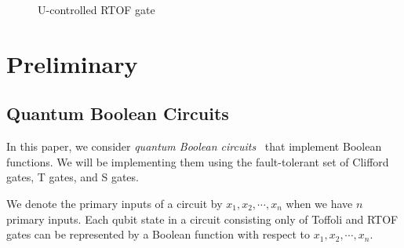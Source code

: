 

\begin{figure}[ht]
  \begin{minipage}{.46\textwidth}

    \begin{center}
      
      \caption{A Boolean logic network}
      \label{fig-lut-network}
    \end{center}
  \end{minipage}
  \begin{minipage}{.46\linewidth}
    \begin{center}
      
    \end{center}
    \caption{U-controlled RTOF gate}
    \label{fig-urtof}
  \end{minipage}
\end{figure}
\section{Preliminary}
\label{Sec:prelim}
\subsection{Quantum Boolean Circuits}

In this paper, we consider {\it quantum Boolean circuits}~\cite{bib-ddmf} that implement Boolean functions. We will be implementing them using the fault-tolerant set of Clifford gates, T gates, and S gates. 

We denote the primary inputs of a circuit by $x_1, x_2, \cdots,x_{n}$  when we have $n$ primary inputs. Each qubit state in a circuit consisting only of Toffoli and RTOF gates can be represented by a Boolean function with respect to $x_1, x_2, \cdots,x_{n}$.


